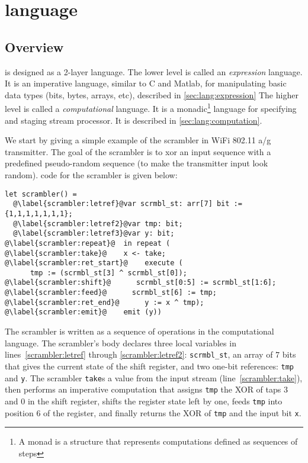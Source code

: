 \chapter{\LANG language}
\label{chap:lang}

\section{Overview}
\label{sec:lang:overview}

\LANG is designed as a 2-layer language. The lower level is called an \emph{expression} language. It is an imperative language, similar to C and Matlab, for manipulating basic data types (bits, bytes, arrays, etc), described in \ref{sec:lang:expression} The higher level is
called a \emph{computational} language. It is a monadic\footnote{A monad is a structure that represents computations defined as sequences of steps} language for specifying and staging stream processor. It is described in \ref{sec:lang:computation}.

We start by giving a simple example of the scrambler in WiFi 802.11 a/g transmitter. The goal of the scrambler is to xor an input sequence with a predefined pseudo-random sequence (to make the transmitter input look random). \LANG code for the scrambler is given below:
\begin{lstlisting}[caption=Scrambler function of WiFi 802.11a/g transmitter in \LANG,
xleftmargin=15pt,
label=lst:wifi:tx:scrambler]
let scrambler() =
  @\label{scrambler:letref}@var scrmbl_st: arr[7] bit := {1,1,1,1,1,1,1}; 
  @\label{scrambler:letref2}@var tmp: bit; 
  @\label{scrambler:letref3}@var y: bit; 
@\label{scrambler:repeat}@  in repeat (
@\label{scrambler:take}@    x <- take;
@\label{scrambler:ret_start}@    execute (
      tmp := (scrmbl_st[3] ^ scrmbl_st[0]);
@\label{scrambler:shift}@      scrmbl_st[0:5] := scrmbl_st[1:6];
@\label{scrambler:feed}@      scrmbl_st[6] := tmp;
@\label{scrambler:ret_end}@      y := x ^ tmp); 
@\label{scrambler:emit}@    emit (y))
\end{lstlisting}
The scrambler is written as a sequence of operations in the
computational language. The scrambler's body declares three local
variables in lines~\ref{scrambler:letref} through
\ref{scrambler:letref2}: \lstinline|scrmbl_st|, an array of $7$ bits
that gives the current state of the shift register, and two one-bit
references: \lstinline|tmp| and \lstinline|y|.  The scrambler
\lstinline|take|s a value from the input stream
(line~\ref{scrambler:take}), then performs an imperative computation
that assigns \lstinline|tmp| the XOR of taps $3$ and $0$ in the shift
register, shifts the register state left by one, feeds \lstinline|tmp|
into position $6$ of the register, and finally returns the XOR of
\lstinline|tmp| and the input bit \lstinline|x|.

